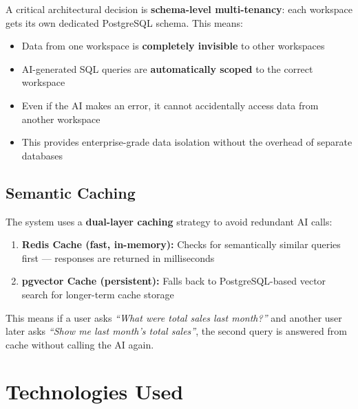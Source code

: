 \documentclass[12pt,a4paper]{report}
\begin{document}
A critical architectural decision is \textbf{schema-level multi-tenancy}: each workspace gets its own dedicated PostgreSQL schema. This means:

\begin{itemize}[leftmargin=1.5cm]
    \item Data from one workspace is \textbf{completely invisible} to other workspaces
    \item AI-generated SQL queries are \textbf{automatically scoped} to the correct workspace
    \item Even if the AI makes an error, it cannot accidentally access data from another workspace
    \item This provides enterprise-grade data isolation without the overhead of separate databases
\end{itemize}

\subsection{Semantic Caching}

The system uses a \textbf{dual-layer caching} strategy to avoid redundant AI calls:

\begin{enumerate}[leftmargin=1.5cm]
    \item \textbf{Redis Cache (fast, in-memory):} Checks for semantically similar queries first --- responses are returned in milliseconds
    \item \textbf{pgvector Cache (persistent):} Falls back to PostgreSQL-based vector search for longer-term cache storage
\end{enumerate}

This means if a user asks \textit{``What were total sales last month?''} and another user later asks \textit{``Show me last month's total sales''}, the second query is answered from cache without calling the AI again.

\section{Technologies Used}
\end{document}
